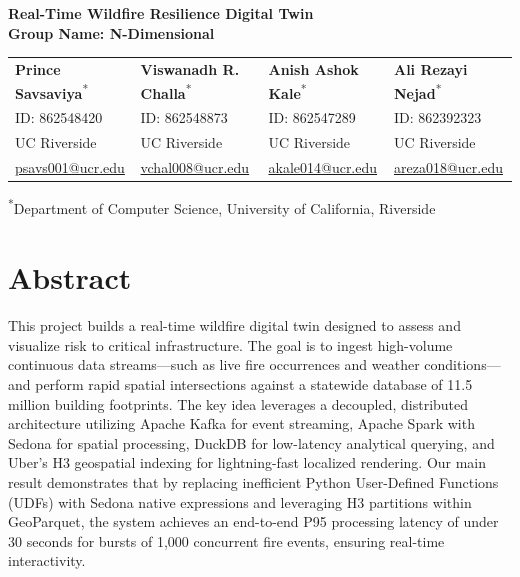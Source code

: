 \documentclass[acmsmall,screen,nonacm]{acmart}
\begin{document}
\begin{center}
    {\Huge \textbf{Real-Time Wildfire Resilience Digital Twin}} \\
    \vspace{0.5em}
    {\Large \textbf{Group Name: N-Dimensional}} \\
    \vspace{2em}

    \hspace*{-1.5cm} 
    \begin{tabular}{ >{\centering\arraybackslash}p{3.8cm} >{\centering\arraybackslash}p{3.8cm} >{\centering\arraybackslash}p{3.8cm} >{\centering\arraybackslash}p{3.8cm} }
        
        \textbf{Prince Savsaviya}\textsuperscript{*} & \textbf{Viswanadh R. Challa}\textsuperscript{*} & \textbf{Anish Ashok Kale}\textsuperscript{*} & \textbf{Ali Rezayi Nejad}\textsuperscript{*} \\
        
        \small ID: 862548420 & \small ID: 862548873 & \small ID: 862547289 & \small ID: 862392323 \\
        
        \small UC Riverside & \small UC Riverside & \small UC Riverside & \small UC Riverside \\
        
        \small \href{mailto:psavs001@ucr.edu}{psavs001@ucr.edu} & 
        \small \href{mailto:vchal008@ucr.edu}{vchal008@ucr.edu} & 
        \small \href{mailto:akale014@ucr.edu}{akale014@ucr.edu} & 
        \small \href{mailto:areza018@ucr.edu}{areza018@ucr.edu} \\
        
    \end{tabular}
    
    \vspace{1em}
    {\footnotesize \textsuperscript{*}Department of Computer Science, University of California, Riverside}
    \vspace{2em}
\end{center}

\date{March 17, 2026}


\section*{Abstract}
This project builds a real-time wildfire digital twin designed to assess and visualize risk to critical infrastructure. The goal is to ingest high-volume continuous data streams—such as live fire occurrences and weather conditions—and perform rapid spatial intersections against a statewide database of 11.5 million building footprints. The key idea leverages a decoupled, distributed architecture utilizing Apache Kafka for event streaming, Apache Spark with Sedona for spatial processing, DuckDB for low-latency analytical querying, and Uber's H3 geospatial indexing for lightning-fast localized rendering. Our main result demonstrates that by replacing inefficient Python User-Defined Functions (UDFs) with Sedona native expressions and leveraging H3 partitions within GeoParquet, the system achieves an end-to-end P95 processing latency of under 30 seconds for bursts of 1,000 concurrent fire events, ensuring real-time interactivity.
\end{document}
